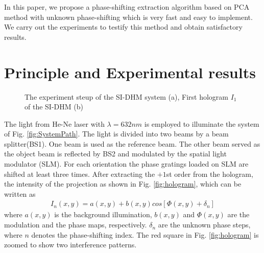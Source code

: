 \documentclass[letterpaper,10pt]{article}
\begin{document}
In this paper, we propose a phase-shifting extraction algorithm based on PCA method with unknown phase-shifting which is very fast and easy to implement.
We carry out the experiments to testify this method and obtain satisfactory results.

\section{Principle and Experimental results}
\begin{figure}[h]
    \centering
    \centering
    \caption{The experiment steup of the SI-DHM system (a), First hologram $I_1$ of the SI-DHM (b)}
\end{figure}
The light from He-Ne laser with $\lambda=632nm$ is employed to illuminate the system of Fig. \ref{fig:SystemPath}.
The light is divided into two beams by a beam splitter(BS1).
One beam is used as the reference beam.
The other beam served as the object beam is reflected by BS2 and modulated by the spatial light modulator (SLM).
For each orientation the phase gratings loaded on SLM are shifted at least three times.
After extracting the $+1$st order from the hologram, the intensity of the projection as shown in Fig. \ref{fig:hologram}, which can be written as
\begin{eqnarray}
 I_{n}(x,y) = a(x,y) + b(x,y)cos[ \Phi(x,y) + \delta_n ] \label{Eq:intensity}
\end{eqnarray}
where $a(x,y)$ is the background illumination, $b(x,y)$ and $\Phi(x,y)$ are the modulation and the phase maps, respectively.
$\delta_n$ are the unknown phase steps, where $n$ denotes the phase-shifting index.
The red square in Fig. \ref{fig:hologram} is zoomed to show two interference patterns.
\end{document}
